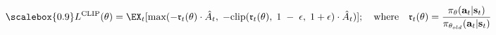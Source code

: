 \begin{equation}
\scalebox{0.9}

     L^{\textrm{CLIP}}(\theta) = \EX_{t}{[\textrm{max}(-\mathfrak{r}_{t}(\theta)\cdot\hat{A}_{t},\; -\textrm{clip}(\mathfrak{r}_{t}(\theta),\;1\;-\;\epsilon,\;1 + \epsilon)\cdot\hat{A}_{t})]};\quad \textrm{where}\quad
     \mathfrak{r}_{t}(\theta) = \frac{\pi_{\theta}(\textbf{a}_t|\textbf{s}_t)}{\pi_{\theta_{old}}(\textbf{a}_t|\textbf{s}_t)}
\label{eq:l_clip}
\end{equation}